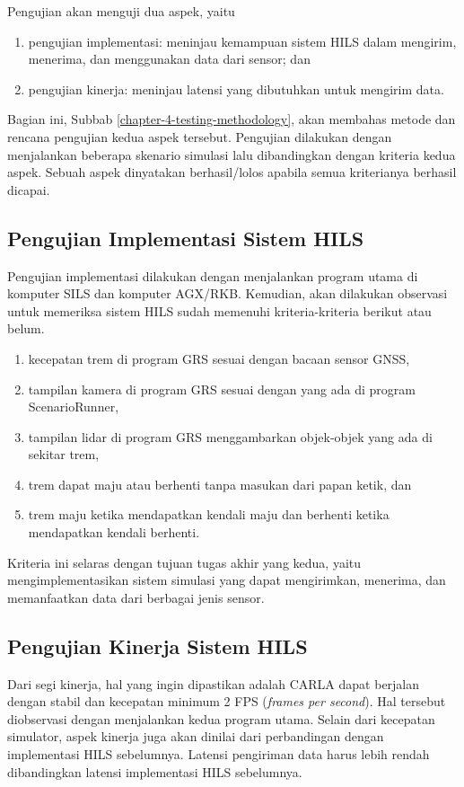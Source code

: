 Pengujian akan menguji dua aspek, yaitu
\begin{enumerate}
	\item pengujian implementasi: meninjau kemampuan sistem HILS dalam mengirim,
	      menerima, dan menggunakan data dari sensor; dan
	\item pengujian kinerja: meninjau latensi yang dibutuhkan untuk mengirim
	      data.
\end{enumerate}
Bagian ini, Subbab \ref{chapter-4-testing-methodology}, akan membahas metode dan
rencana pengujian kedua aspek tersebut. Pengujian dilakukan dengan menjalankan
beberapa skenario simulasi lalu dibandingkan dengan kriteria kedua aspek. Sebuah
aspek dinyatakan berhasil/lolos apabila semua kriterianya berhasil dicapai.

\subsection{Pengujian Implementasi Sistem HILS}

Pengujian implementasi dilakukan dengan menjalankan program utama di komputer
SILS dan komputer AGX/RKB. Kemudian, akan dilakukan observasi untuk memeriksa
sistem HILS sudah memenuhi kriteria-kriteria berikut atau belum.

\begin{enumerate}
	\item kecepatan trem di program GRS sesuai dengan bacaan sensor GNSS,
	\item tampilan kamera di program GRS sesuai dengan yang ada di program
	      ScenarioRunner,
	\item tampilan lidar di program GRS menggambarkan objek-objek yang ada di
	      sekitar trem,
	\item trem dapat maju atau berhenti tanpa masukan dari papan ketik, dan
	\item trem maju ketika mendapatkan kendali maju dan berhenti ketika
	      mendapatkan kendali berhenti.
\end{enumerate}

Kriteria ini selaras dengan tujuan tugas akhir yang kedua, yaitu
mengimplementasikan sistem simulasi yang dapat mengirimkan, menerima, dan
memanfaatkan data dari berbagai jenis sensor.

\subsection{Pengujian Kinerja Sistem HILS}

Dari segi kinerja, hal yang ingin dipastikan adalah CARLA dapat berjalan dengan
stabil dan kecepatan minimum 2 FPS (\textit{frames per second}). Hal tersebut
diobservasi dengan menjalankan kedua program utama. Selain dari kecepatan
simulator, aspek kinerja juga akan dinilai dari perbandingan dengan implementasi
HILS sebelumnya. Latensi pengiriman data harus lebih rendah dibandingkan latensi
implementasi HILS sebelumnya.

